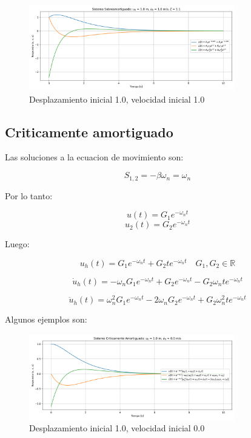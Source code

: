 \documentclass{article}  %
\begin{document}
\begin{figure}[H]
    \centering
    \includegraphics[width=0.8\textwidth]{GRAFICOS/sis_sobreamortiguado_u0_1.0_v0_1.0_zeta_1.1.png}
    \caption{Desplazamiento inicial 1.0, velocidad inicial 1.0}
    \label{fig:ejemplo1}
\end{figure}

\subsection{Criticamente amortiguado}

Las soluciones a la ecuacion de movimiento son:

\begin{equation}
   S_{1,2} = -\beta \omega_n = \omega_n
\end{equation}

Por lo tanto:

\begin{equation}
    u(t) = G_1e^{-\omega_n t} 
\end{equation}
\begin{equation}
    u_2(t) = G_2e^{-\omega_n t}
\end{equation}

Luego:

\begin{equation}
    u_h(t) = G_1e^{-\omega_n t} + G_2te^{-\omega_n t} \quad G_1, G_2 \in \mathbb{R}
\end{equation}

\begin{equation}
    \dot{u}_h(t) = -\omega_n G_1e^{-\omega_n t} + G_2e^{-\omega_n t} - G_2\omega_n te^{-\omega_n t}
\end{equation}

\begin{equation}
    \ddot{u}_h(t) = \omega_n^2 G_1e^{-\omega_n t} - 2\omega_n G_2e^{-\omega_n t} + G_2\omega_n^2 te^{-\omega_n t}
\end{equation}

Algunos ejemplos son:
\begin{figure}[H]
    \centering
    \includegraphics[width=0.8\textwidth]{GRAFICOS/sis_criticamente_amortiguado_u0_1.0_v0_0.0.png}
    \caption{Desplazamiento inicial 1.0, velocidad inicial 0.0}
    \label{fig:ejemplo1}
\end{figure}
\end{document}
